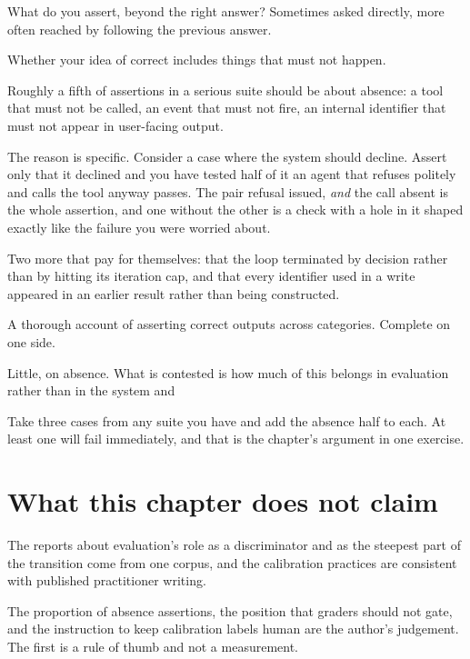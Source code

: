 \begin{bankq}{What do you assert, beyond the right answer?}
\qasked
Sometimes asked directly, more often reached by following the previous answer.

\qtested
Whether your idea of correct includes things that must not happen.

\qstaff
Roughly a fifth of assertions in a serious suite should be about absence: a
tool that must not be called, an event that must not fire, an internal
identifier that must not appear in user-facing output.

The reason is specific. Consider a case where the system should decline. Assert
only that it declined and you have tested half of it \dash{} an agent that
refuses politely and calls the tool anyway passes. The pair \dash{} refusal
issued, \emph{and} the call absent \dash{} is the whole assertion, and one
without the other is a check with a hole in it shaped exactly like the failure
you were worried about.


Two more that pay for themselves: that the loop terminated by decision rather
than by hitting its iteration cap, and that every identifier used in a write
appeared in an earlier result rather than being constructed.

\qsenior
A thorough account of asserting correct outputs across categories. Complete on
one side.

\qcontested
Little, on absence. What is contested is how much of this belongs in evaluation
rather than in the system \dash{} and 

\qdrill
Take three cases from any suite you have and add the absence half to each. At
least one will fail immediately, and that is the chapter's argument in one
exercise.
\end{bankq}


\section*{What this chapter does not claim}

The reports about evaluation's role as a discriminator and as the steepest part
of the transition come from one corpus, and the calibration practices are
consistent with published practitioner writing.

The proportion of absence assertions, the position that graders should not
gate, and the instruction to keep calibration labels human are the author's
judgement. The first is a rule of thumb and not a measurement.

